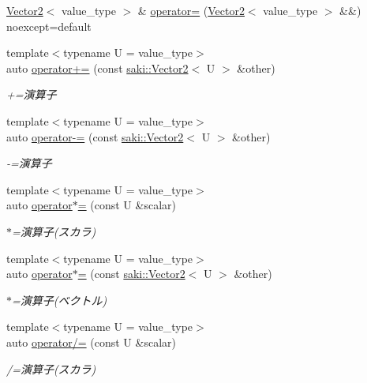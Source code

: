 \begin{DoxyCompactItemize}
\item 
\mbox{\hyperlink{classsaki_1_1_vector2}{Vector2}}$<$ value\+\_\+type $>$ \& \mbox{\hyperlink{classsaki_1_1_vector2_a1091cb5b6abb91b5d96aabeb706c351d}{operator=}} (\mbox{\hyperlink{classsaki_1_1_vector2}{Vector2}}$<$ value\+\_\+type $>$ \&\&) noexcept=default
\item 
{\footnotesize template$<$typename U  = value\+\_\+type$>$ }\\auto \mbox{\hyperlink{classsaki_1_1_vector2_aeb7ee155c7e6ae8b6c880245c6d943c1}{operator+=}} (const \mbox{\hyperlink{classsaki_1_1_vector2}{saki\+::\+Vector2}}$<$ U $>$ \&other)
\begin{DoxyCompactList}\small\item\em +=演算子 \end{DoxyCompactList}\item 
{\footnotesize template$<$typename U  = value\+\_\+type$>$ }\\auto \mbox{\hyperlink{classsaki_1_1_vector2_afd6a046c01ddbe65b965b1e0ad7ef2ef}{operator-\/=}} (const \mbox{\hyperlink{classsaki_1_1_vector2}{saki\+::\+Vector2}}$<$ U $>$ \&other)
\begin{DoxyCompactList}\small\item\em -\/=演算子 \end{DoxyCompactList}\item 
{\footnotesize template$<$typename U  = value\+\_\+type$>$ }\\auto \mbox{\hyperlink{classsaki_1_1_vector2_aab202f42563239dfb59d27295d6c7462}{operator$\ast$=}} (const U \&scalar)
\begin{DoxyCompactList}\small\item\em $\ast$=演算子(スカラ) \end{DoxyCompactList}\item 
{\footnotesize template$<$typename U  = value\+\_\+type$>$ }\\auto \mbox{\hyperlink{classsaki_1_1_vector2_af60d3a1c5bb11eff48377b7041d38d13}{operator$\ast$=}} (const \mbox{\hyperlink{classsaki_1_1_vector2}{saki\+::\+Vector2}}$<$ U $>$ \&other)
\begin{DoxyCompactList}\small\item\em $\ast$=演算子(ベクトル) \end{DoxyCompactList}\item 
{\footnotesize template$<$typename U  = value\+\_\+type$>$ }\\auto \mbox{\hyperlink{classsaki_1_1_vector2_a77f6c9bcfeb9f830edf2883069894a30}{operator/=}} (const U \&scalar)
\begin{DoxyCompactList}\small\item\em /=演算子(スカラ) \end{DoxyCompactList}\item 

\end{DoxyCompactItemize}
